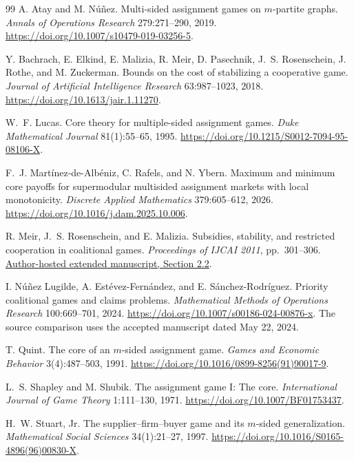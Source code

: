 \documentclass[11pt]{article}
\theoremstyle{remark}
\begin{document}
\begin{thebibliography}{99}
\small
{}
A. Atay and M. N\'u\~nez.
Multi-sided assignment games on $m$-partite graphs.
\emph{Annals of Operations Research} 279:271--290, 2019.
\href{https://doi.org/10.1007/s10479-019-03256-5}{https://doi.org/10.1007/s10479-019-03256-5}.

Y. Bachrach, E. Elkind, E. Malizia, R. Meir, D. Pasechnik,
J.~S. Rosenschein, J. Rothe, and M. Zuckerman.
Bounds on the cost of stabilizing a cooperative game.
\emph{Journal of Artificial Intelligence Research} 63:987--1023, 2018.
\href{https://doi.org/10.1613/jair.1.11270}{https://doi.org/10.1613/jair.1.11270}.

W.~F. Lucas. Core theory for multiple-sided assignment games.
\emph{Duke Mathematical Journal} 81(1):55--65, 1995.
\href{https://doi.org/10.1215/S0012-7094-95-08106-X}{https://doi.org/10.1215/S0012-7094-95-08106-X}.

F.~J. Mart\'inez-de-Alb\'eniz, C. Rafels, and N. Ybern.
Maximum and minimum core payoffs for supermodular multisided assignment
markets with local monotonicity.
\emph{Discrete Applied Mathematics} 379:605--612, 2026.
\href{https://doi.org/10.1016/j.dam.2025.10.006}{https://doi.org/10.1016/j.dam.2025.10.006}.

R. Meir, J.~S. Rosenschein, and E. Malizia.
Subsidies, stability, and restricted cooperation in coalitional games.
\emph{Proceedings of IJCAI 2011}, pp.~301--306.
\href{https://www.cs.huji.ac.il/~jeff/papers/coopmas11meir.pdf}{Author-hosted extended manuscript, Section 2.2}.

I. N\'u\~nez Lugilde, A. Est\'evez-Fern\'andez, and E. S\'anchez-Rodr\'iguez.
Priority coalitional games and claims problems.
\emph{Mathematical Methods of Operations Research} 100:669--701, 2024.
\href{https://doi.org/10.1007/s00186-024-00876-x}{https://doi.org/10.1007/s00186-024-00876-x}.
The source comparison uses the accepted manuscript dated May 22, 2024.

T. Quint. The core of an $m$-sided assignment game.
\emph{Games and Economic Behavior} 3(4):487--503, 1991.
\href{https://doi.org/10.1016/0899-8256(91)90017-9}{https://doi.org/10.1016/0899-8256(91)90017-9}.

L.~S. Shapley and M. Shubik.
The assignment game I: The core.
\emph{International Journal of Game Theory} 1:111--130, 1971.
\href{https://doi.org/10.1007/BF01753437}{https://doi.org/10.1007/BF01753437}.

H.~W. Stuart, Jr. The supplier--firm--buyer game and its $m$-sided generalization.
\emph{Mathematical Social Sciences} 34(1):21--27, 1997.
\href{https://doi.org/10.1016/S0165-4896(96)00830-X}{https://doi.org/10.1016/S0165-4896(96)00830-X}.
\end{thebibliography}
\end{document}
